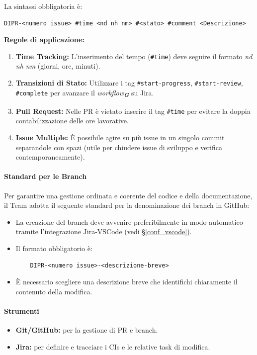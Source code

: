 \documentclass[a4paper,12pt]{article}
\newcommand{\glossario}[1]{\textit{#1}\textsubscript{\textbf{\textit{\textcolor{lightblack}{G}}}}}
\begin{document}
La sintassi obbligatoria è:
\begin{verbatim}
DIPR-<numero issue> #time <nd nh nm> #<stato> #comment <Descrizione> 
\end{verbatim}

\textbf{Regole di applicazione:}
\begin{enumerate}
    \item \textbf{Time Tracking:} L'inserimento del tempo (\texttt{\#time}) deve seguire il formato \textit{nd nh nm} (giorni, ore, minuti).
    \item \textbf{Transizioni di Stato:} Utilizzare i tag \texttt{\#start-progress}, \texttt{\#start-review}, \texttt{\#complete} per avanzare il \glossario{workflow} su Jira.
    \item \textbf{Pull Request:} Nelle PR è vietato inserire il tag \texttt{\#time} per evitare la doppia contabilizzazione delle ore lavorative.
    \item \textbf{Issue Multiple:} È possibile agire su più issue in un singolo commit separandole con spazi (utile per chiudere issue di sviluppo e verifica contemporaneamente).
\end{enumerate}

\paragraph{Standard per le Branch} \label{stdBranch}
Per garantire una gestione ordinata e coerente del codice e della
documentazione, il Team adotta il seguente standard per la denominazione dei
branch in GitHub:
\begin{itemize}
    \item La creazione del branch deve avvenire preferibilmente in modo automatico
          tramite l'integrazione Jira-VSCode (vedi §\ref{conf_vscode}).
    \item Il formato obbligatorio è:
          \begin{verbatim}
    DIPR-<numero issue>-<descrizione-breve>
    \end{verbatim}
    \item È necessario scegliere una descrizione breve che identifichi chiaramente il contenuto della modifica.
\end{itemize}

\paragraph{Strumenti}
\begin{itemize}
    \item \textbf{Git/GitHub:} per la gestione di PR e branch.
    \item \textbf{Jira:} per definire e tracciare i CIs e le relative task di modifica.
\end{itemize}
\end{document}
